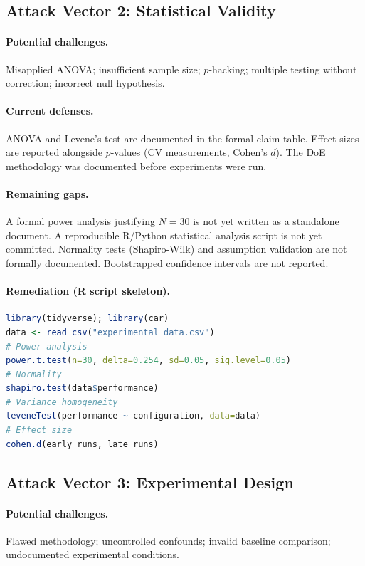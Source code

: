 \subsection{Attack Vector 2: Statistical Validity}

\paragraph{Potential challenges.}
Misapplied ANOVA; insufficient sample size; $p$-hacking; multiple testing
without correction; incorrect null hypothesis.

\paragraph{Current defenses.}
ANOVA and Levene's test are documented in the formal claim table. Effect
sizes are reported alongside $p$-values (CV measurements, Cohen's $d$). The
DoE methodology was documented before experiments were run.

\paragraph{Remaining gaps.}
A formal power analysis justifying $N = 30$ is not yet written as a
standalone document. A reproducible R/Python statistical analysis script is
not yet committed. Normality tests (Shapiro-Wilk) and assumption validation
are not formally documented. Bootstrapped confidence intervals are not
reported.

\paragraph{Remediation (R script skeleton).}
\begin{lstlisting}[language=R]
library(tidyverse); library(car)
data <- read_csv("experimental_data.csv")
# Power analysis
power.t.test(n=30, delta=0.254, sd=0.05, sig.level=0.05)
# Normality
shapiro.test(data$performance)
# Variance homogeneity
leveneTest(performance ~ configuration, data=data)
# Effect size
cohen.d(early_runs, late_runs)
\end{lstlisting}

\subsection{Attack Vector 3: Experimental Design}

\paragraph{Potential challenges.}
Flawed methodology; uncontrolled confounds; invalid baseline comparison;
undocumented experimental conditions.


